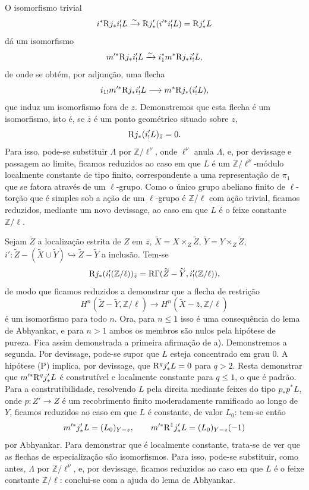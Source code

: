 O isomorfismo trivial
\[
i^*\mathrm{R} j_*i'_!L\xrightarrow{\sim}\mathrm{R} j'_*(i'^*i'_!L)=\mathrm{R} j'_*L
\]
dá um isomorfismo
\[
m'^*\mathrm{R} j_*i'_!L\xrightarrow{\sim} i_1^*m^*\mathrm{R} j_*i'_!L,
\]
de onde se obtém, por adjunção, uma flecha
\[
i_{1!}m'^*\mathrm{R} j_*i'_!L\longrightarrow m^*\mathrm{R} j_*(i'_!L),
\]
que induz um isomorfismo fora de $z$. Demonstremos que esta flecha é um isomorfismo, isto é, se $\bar z$ é um ponto geométrico situado sobre $z$,
\[
\mathrm{R} j_*(i'_!L)_{\bar z}=0.
\]
Para isso, pode-se substituir $\Lambda$ por $\mathbb Z/\ell^\nu$, onde $\ell^\nu$ anula $\Lambda$, e, por devissage e passagem ao limite, ficamos reduzidos ao caso em que $L$ é um $\mathbb Z/\ell^\nu$-módulo localmente constante de tipo finito, correspondente a uma representação de $\pi_1$ que se fatora através de um $\ell$-grupo. Como o único grupo abeliano finito de $\ell$-torção que é simples sob a ação de um $\ell$-grupo é $\mathbb Z/\ell$ com ação trivial, ficamos reduzidos, mediante um novo devissage, ao caso em que $L$ é o feixe constante $\mathbb Z/\ell$.

Sejam $\widetilde Z$ a localização estrita de $Z$ em $\bar z$, $\widetilde X=X\times_Z\widetilde Z$, $\widetilde Y=Y\times_Z\widetilde Z$, $i':\widetilde Z-(\widetilde X\cup\widetilde Y)\hookrightarrow \widetilde Z-\widetilde Y$ a inclusão. Tem-se
\[
\mathrm{R} j_*(i'_!(\mathbb Z/\ell))_{\bar z}
=\mathrm{R}\Gamma(\widetilde Z-\widetilde Y,i'_!(\mathbb Z/\ell)),
\]
de modo que ficamos reduzidos a demonstrar que a flecha de restrição
\[
H^n(\widetilde Z-\widetilde Y,\mathbb Z/\ell)
\longrightarrow
H^n(\widetilde X-\bar z,\mathbb Z/\ell)
\]
é um isomorfismo para todo $n$. Ora, para $n\le1$ isso é uma consequência do lema de Abhyankar, e para $n>1$ ambos os membros são nulos pela hipótese de pureza. Fica assim demonstrada a primeira afirmação de a). Demonstremos a segunda. Por devissage, pode-se supor que $L$ esteja concentrado em grau $0$. A hipótese (P) implica, por devissage, que $\mathrm{R}^qj'_*L=0$ para $q>2$. Resta demonstrar que $m'^*\mathrm{R}^qj'_*L$ é construtível e localmente constante para $q\le1$, o que é padrão. Para a construtibilidade, resolvendo $L$ pela direita mediante feixes do tipo $p_*p^*L$, onde $p:Z'\to Z$ é um recobrimento finito moderadamente ramificado ao longo de $Y$, ficamos reduzidos ao caso em que $L$ é constante, de valor $L_0$: tem-se então
\[
m'^*j'_*L=(L_0)_{Y-z},
\qquad
m'^*\mathrm{R}^1j'_*L=(L_0)_{Y-z}(-1)
\]
por Abhyankar. Para demonstrar que é localmente constante, trata-se de ver que as flechas de especialização são isomorfismos. Para isso, pode-se substituir, como antes, $\Lambda$ por $\mathbb Z/\ell^\nu$, e, por devissage, ficamos reduzidos ao caso em que $L$ é o feixe constante $\mathbb Z/\ell$: conclui-se com a ajuda do lema de Abhyankar.
